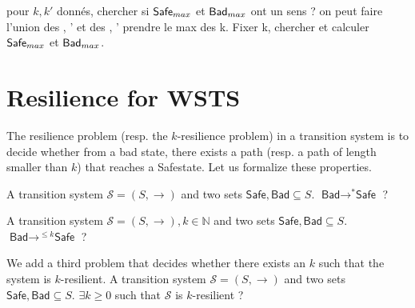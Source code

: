 

pour $k,k'$ donnés, chercher si $\Safe_{max}$ et $\Bad_{max}$ ont un sens ? on peut faire l'union des \Safe, \Safe' et des \Bad, \Bad' prendre le max des k. Fixer k, chercher et calculer $\Safe_{max}$ et $\Bad_{max}$.

%

\fi




\newcommand{\Bad}{\textsf{Bad}}
\newcommand{\Safe}{\textsf{Safe}}



\section{Resilience for WSTS}


The resilience problem (resp. the $k$-resilience problem) in a transition system is to decide whether from a bad state, there exists a path (resp. a path of length smaller than $k$) that reaches a \Safe state. Let us formalize these properties.

{A transition system $\mathscr{S}=(S,\rightarrow)$ and two sets $\Safe, \Bad \subseteq S$.}
{$\Bad \longrightarrow^{*} \Safe$ ?\newline}
%

{A transition system $\mathscr{S}=(S,\rightarrow), k \in \mathbb{N}$ and two sets $\Safe, \Bad \subseteq S$.}
{$\Bad \longrightarrow^{\leq k} \Safe$ ?\newline}

We add a third problem that decides whether there exists an $k$ such  that the system is $k$-resilient.
%
{A transition system $\mathscr{S}=(S,\rightarrow)$ and two sets $\Safe, \Bad \subseteq S$.}
{$\exists k \geq 0$ such that $\mathscr{S}$ is %
 $k$-resilient ?\newline}

